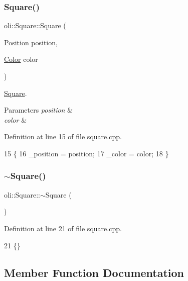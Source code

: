 \subsubsection{\texorpdfstring{Square()}{Square()}\hspace{0.1cm}{\footnotesize\ttfamily [3/3]}}
{\footnotesize\ttfamily oli\+::\+Square\+::\+Square (\begin{DoxyParamCaption}\item[{\hyperlink{classoli_1_1_position}{Position}}]{position,  }\item[{\hyperlink{namespaceoli_aac44697e43b3ab2ad32fe892ab2276eb}{Color}}]{color }\end{DoxyParamCaption})}



\hyperlink{classoli_1_1_square}{Square}. 


\begin{DoxyParams}{Parameters}
{\em position} & \\
\hline
{\em color} & \\
\hline
\end{DoxyParams}


Definition at line 15 of file square.\+cpp.


\begin{DoxyCode}
15                                            \{
16     \_position = position;
17     \_color = color;
18 \}
\end{DoxyCode}
\hypertarget{classoli_1_1_square_ae3a146c140b1c641391cb0a2f3319719}{}\label{classoli_1_1_square_ae3a146c140b1c641391cb0a2f3319719} 
\subsubsection{\texorpdfstring{$\sim$\+Square()}{~Square()}}
{\footnotesize\ttfamily oli\+::\+Square\+::$\sim$\+Square (\begin{DoxyParamCaption}{ }\end{DoxyParamCaption})}



Definition at line 21 of file square.\+cpp.


\begin{DoxyCode}
21 \{\}
\end{DoxyCode}


\subsection{Member Function Documentation}
\hypertarget{classoli_1_1_square_aa8ed3521a370df288e9085222660d7ea}{}\label{classoli_1_1_square_aa8ed3521a370df288e9085222660d7ea} 
